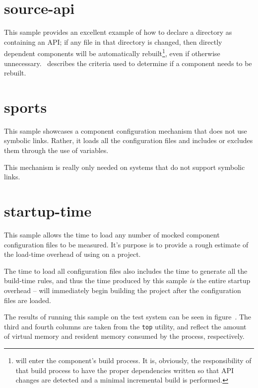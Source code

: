 \section{source-api}

This sample provides an excellent example of how to declare a \destdir
directory as containing an API; if any file in that directory is
changed, then directly dependent components will be automatically
rebuilt\footnote{\lmsbw will enter the component's build process.  It
  is, obviously, the responsibility of that build process to have the
  proper dependencies written so that API changes are detected and a
  minimal incremental build is performed.}, even if otherwise
unnecessary.  ~describes the
criteria used to determine if a component needs to be rebuilt.

\section{sports}\label{samples:sports}

This sample showcases a component configuration mechanism that does
not use symbolic links.  Rather, it loads all the configuration files
and includes or excludes them through the use of \make variables.

This mechanism is really only needed on systems that do not support
symbolic links.

\section{startup-time}\label{samples:startup-time}

This sample allows the time to load any number of mocked component
configuration files to be measured. It's purpose is to provide a rough
estimate of the load-time overhead of using \lmsbw on a project.

The time to load all configuration files also includes the time to
generate all the build-time \make rules, and thus the time produced by
this sample \emph{is} the entire startup overhead -- \make will
immediately begin building the project after the configuration files
are loaded.

The results of running this sample on the test system can be seen in
figure~.  The third and fourth
columns are taken from the \texttt{top} utility, and reflect the
amount of virtual memory and resident memory consumed by the process,
respectively.

